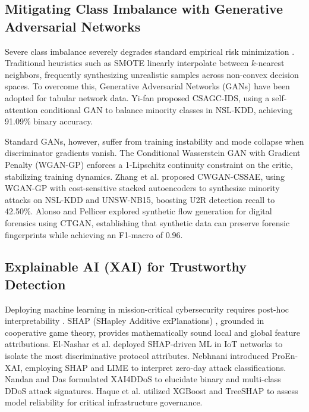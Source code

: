 \documentclass[journal]{IEEEtran}
\begin{document}
\subsection{Mitigating Class Imbalance with Generative Adversarial Networks}
Severe class imbalance severely degrades standard empirical risk minimization \cite{bedi2021isiamids}. Traditional heuristics such as SMOTE \cite{chawla2002smote} linearly interpolate between $k$-nearest neighbors, frequently synthesizing unrealistic samples across non-convex decision spaces. To overcome this, Generative Adversarial Networks (GANs) have been adopted for tabular network data. Yi-fan \cite{yifan2025csagc} proposed CSAGC-IDS, using a self-attention conditional GAN to balance minority classes in NSL-KDD, achieving 91.09\% binary accuracy. 

Standard GANs, however, suffer from training instability and mode collapse when discriminator gradients vanish. The Conditional Wasserstein GAN with Gradient Penalty (WGAN-GP) \cite{gulrajani2017improved, mirza2014conditional} enforces a 1-Lipschitz continuity constraint on the critic, stabilizing training dynamics. Zhang et al. \cite{zhang2020network} proposed CWGAN-CSSAE, using WGAN-GP with cost-sensitive stacked autoencoders to synthesize minority attacks on NSL-KDD and UNSW-NB15, boosting U2R detection recall to 42.50\%. Alonso and Pellicer \cite{alonso2026forensic} explored synthetic flow generation for digital forensics using CTGAN, establishing that synthetic data can preserve forensic fingerprints while achieving an F1-macro of 0.96.

\subsection{Explainable AI (XAI) for Trustworthy Detection}
Deploying machine learning in mission-critical cybersecurity requires post-hoc interpretability \cite{alatawi2025enhancing, berrezzek2026explainable}. SHAP (SHapley Additive exPlanations) \cite{lundberg2017unified, lundberg2020local}, grounded in cooperative game theory, provides mathematically sound local and global feature attributions. El-Nashar et al. \cite{elnashar2025efficient} deployed SHAP-driven ML in IoT networks to isolate the most discriminative protocol attributes. Nebhnani \cite{nebhnani2025proen} introduced ProEn-XAI, employing SHAP and LIME to interpret zero-day attack classifications. Nandan and Das \cite{nandan2025xai4ddos} formulated XAI4DDoS to elucidate binary and multi-class DDoS attack signatures. Haque et al. \cite{haque2026explainable} utilized XGBoost and TreeSHAP to assess model reliability for critical infrastructure governance.
\end{document}
